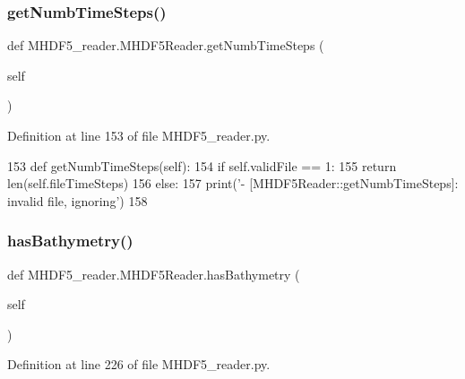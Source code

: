 \subsubsection{\texorpdfstring{get\+Numb\+Time\+Steps()}{getNumbTimeSteps()}}
{\footnotesize\ttfamily def M\+H\+D\+F5\+\_\+reader.\+M\+H\+D\+F5\+Reader.\+get\+Numb\+Time\+Steps (\begin{DoxyParamCaption}\item[{}]{self }\end{DoxyParamCaption})}



Definition at line 153 of file M\+H\+D\+F5\+\_\+reader.\+py.


\begin{DoxyCode}
153     \textcolor{keyword}{def }getNumbTimeSteps(self):
154         \textcolor{keywordflow}{if} self.validFile == 1:
155             \textcolor{keywordflow}{return} len(self.fileTimeSteps)
156         \textcolor{keywordflow}{else}:
157             print(\textcolor{stringliteral}{'- [MHDF5Reader::getNumbTimeSteps]: invalid file, ignoring'})
158     
\end{DoxyCode}
\mbox{\label{class_m_h_d_f5__reader_1_1_m_h_d_f5_reader_a7e1fc985528e18756f46dd9d31bc6530}} 
\subsubsection{\texorpdfstring{has\+Bathymetry()}{hasBathymetry()}}
{\footnotesize\ttfamily def M\+H\+D\+F5\+\_\+reader.\+M\+H\+D\+F5\+Reader.\+has\+Bathymetry (\begin{DoxyParamCaption}\item[{}]{self }\end{DoxyParamCaption})}



Definition at line 226 of file M\+H\+D\+F5\+\_\+reader.\+py.


